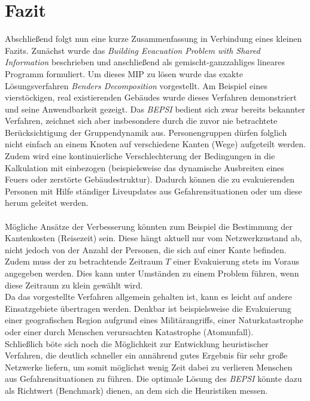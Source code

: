 \documentclass[a4paper, 11pt]{scrreprt}
\begin{document}
\chapter{Fazit}
Abschließend folgt nun eine kurze Zusammenfassung in Verbindung eines kleinen Fazits.
Zunächst wurde das \textit{Building Evacuation Problem with Shared Information} beschrieben
und anschließend als gemischt-ganzzahliges lineares Programm formuliert.
Um dieses MIP zu lösen wurde das exakte Lösungsverfahren \textit{Benders Decomposition}
vorgestellt. Am Beispiel eines vierstöckigen, real existierenden Gebäudes wurde dieses
Verfahren demonstriert und seine Anwendbarkeit gezeigt.
Das \textit{BEPSI} bedient sich zwar bereits bekannter Verfahren, zeichnet sich aber
insbesondere durch die zuvor nie betrachtete Berücksichtigung der Gruppendynamik aus.
Personengruppen dürfen folglich nicht einfach an einem Knoten auf verschiedene Kanten
(Wege) aufgeteilt werden.
Zudem wird eine kontinuierliche Verschlechterung der Bedingungen in die Kalkulation
mit einbezogen (beispielsweise das dynamische Ausbreiten eines Feuers oder zerstörte
Gebäudestruktur). Dadurch können die zu evakuierenden Personen mit Hilfe ständiger
Liveupdates aus Gefahrensituationen oder um diese herum geleitet werden.\\
\\
Mögliche Ansätze der Verbesserung könnten zum Beispiel die Bestimmung der Kantenkosten
(Reisezeit) sein. Diese hängt aktuell nur vom Netzwerkzustand ab, nicht jedoch von der
Anzahl der Personen, die sich auf einer Kante befinden. Zudem muss der zu betrachtende
Zeitraum $T$ einer Evakuierung stets im Voraus angegeben werden. Dies kann unter Umständen
zu einem Problem führen, wenn diese Zeitraum zu klein gewählt wird.\\
Da das vorgestellte Verfahren allgemein gehalten ist, kann es leicht auf andere
Einsatzgebiete übertragen werden. Denkbar ist beispielsweise die Evakuierung einer
geografischen Region aufgrund eines Militärangriffs, einer Naturkatastrophe oder
einer durch Menschen verursachten Katastrophe (Atomunfall).\\
Schließlich böte sich noch die Möglichkeit zur Entwicklung heuristischer Verfahren,
die deutlich schneller ein annährend gutes Ergebnis für sehr große Netzwerke liefern, um somit
möglichst wenig Zeit dabei zu verlieren Menschen aus Gefahrensituationen zu führen.
Die optimale Lösung des \textit{BEPSI} könnte dazu als Richtwert (Benchmark) dienen, an dem
sich die Heuristiken messen.


\newpage
\singlespacing



\end{document}
